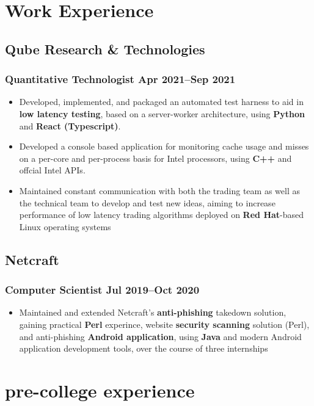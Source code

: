 \documentclass[a4paper]{article}
\begin{document}
\section*{Work Experience}
\subsection*{Qube Research \& Technologies}
\subsubsection*{Quantitative Technologist \hfill Apr 2021--Sep 2021}
\begin{itemize}
	\item Developed, implemented, and packaged an automated test harness to aid in \textbf{low 
	latency testing}, based on a server-worker architecture, using \textbf{Python}
	and \textbf{React (Typescript)}.
	\item Developed a console based application for monitoring cache usage and misses on a 
	per-core and per-process basis for Intel processors, using \textbf{C++} and offcial Intel APIs.
	\item Maintained constant communication with both the trading team as well as the technical team
	to develop and test new ideas, aiming to increase performance of low latency trading algorithms
	deployed on \textbf{Red Hat}-based Linux operating systems
\end{itemize}

\subsection*{Netcraft}
\subsubsection*{Computer Scientist \hfill Jul 2019--Oct 2020}
\begin{itemize}
	\item Maintained and extended Netcraft's \textbf{anti-phishing} takedown 
	solution, gaining practical \textbf{Perl} experince, website \textbf{security scanning}
	solution (Perl), and anti-phishing \textbf{Android application}, using \textbf{Java} 
	and modern Android application development tools, over the course of three internships 
\end{itemize}

\section*{pre-college experience}
\end{document}
